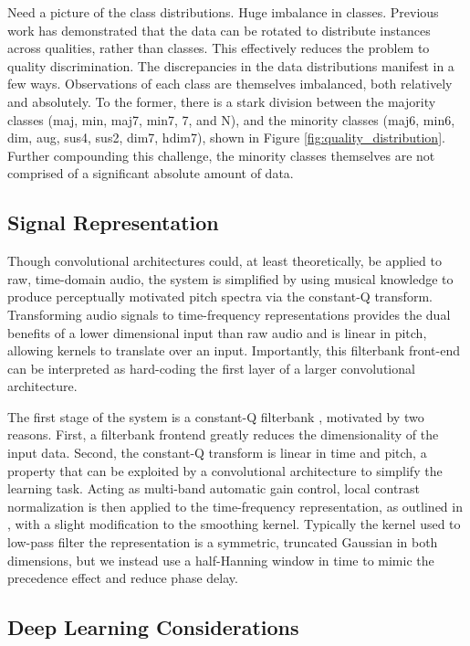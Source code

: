 Need a picture of the class distributions.
Huge imbalance in classes.
Previous work has demonstrated that the data can be rotated to distribute instances across qualities, rather than classes.
This effectively reduces the problem to quality discrimination.
The discrepancies in the data distributions manifest in a few ways.
Observations of each class are themselves imbalanced, both relatively and absolutely.
To the former, there is a stark division between the majority classes (maj, min, maj7, min7, 7, and N), and the minority classes (maj6, min6, dim, aug, sus4, sus2, dim7, hdim7), shown in Figure \ref{fig:quality_distribution}.
Further compounding this challenge, the minority classes themselves are not comprised of a significant absolute amount of data.



\subsection{Signal Representation}


Though convolutional architectures could, at least theoretically, be applied to raw, time-domain audio, the system is simplified by using musical knowledge to produce perceptually motivated pitch spectra via the constant-Q transform.
Transforming audio signals to time-frequency representations provides the dual benefits of a lower dimensional input than raw audio and is linear in pitch, allowing kernels to translate over an input.
Importantly, this filterbank front-end can be interpreted as hard-coding the first layer of a larger convolutional architecture.

The first stage of the system is a constant-Q filterbank \cite{Schoerkhuber2009}, motivated by two reasons.
First, a filterbank frontend greatly reduces the dimensionality of the input data.
Second, the constant-Q transform is linear in time and pitch, a property that can be exploited by a convolutional architecture to simplify the learning task.
Acting as multi-band automatic gain control, local contrast normalization is then applied to the time-frequency representation, as outlined in \cite{LeCun2010}, with a slight modification to the smoothing kernel.
Typically the kernel used to low-pass filter the representation is a symmetric, truncated Gaussian in both dimensions, but we instead use a half-Hanning window in time to mimic the precedence effect and reduce phase delay.


\subsection{Deep Learning Considerations}

